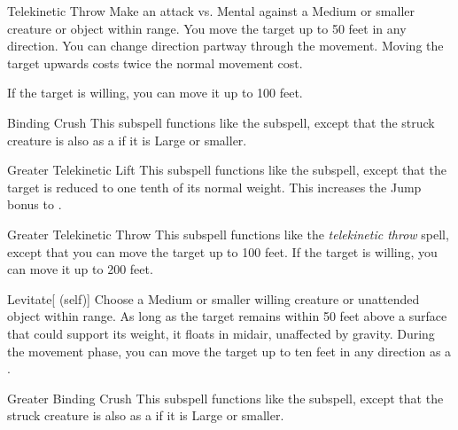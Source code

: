 \begin{ability}[\nth{1}]{Telekinetic Throw}
Make an attack vs. Mental against a Medium or smaller creature or object within \rngmed range.
\hit You move the target up to 50 feet in any direction.
You can change direction partway through the movement.
Moving the target upwards costs twice the normal movement cost.

If the target is willing, you can move it up to 100 feet.
\end{ability}
\vspace{0.25em}


\begin{ability}[\nth{2}]{Binding Crush}
This subspell functions like the  subspell, except that the struck creature is also  as a  if it is Large or smaller.
\end{ability}
\vspace{0.25em}


\begin{ability}[\nth{3}]{Greater Telekinetic Lift}
This subspell functions like the  subspell, except that the target is reduced to one tenth of its normal weight.
This increases the Jump bonus to .
\end{ability}
\vspace{0.25em}


\begin{ability}[\nth{3}]{Greater Telekinetic Throw}
This subspell functions like the \textit{telekinetic throw} spell, except that you can move the target up to 100 feet.
If the target is willing, you can move it up to 200 feet.
\end{ability}
\vspace{0.25em}


\begin{ability}[\nth{4}]{Levitate}[ (self)]
Choose a Medium or smaller willing creature or unattended object within \rngclose range.
As long as the target remains within 50 feet above a surface that could support its weight, it floats in midair, unaffected by gravity.
During the movement phase, you can move the target up to ten feet in any direction as a .
\end{ability}
\vspace{0.25em}


\begin{ability}[\nth{5}]{Greater Binding Crush}
This subspell functions like the  subspell, except that the struck creature is also  as a  if it is Large or smaller.
\end{ability}
\vspace{0.25em}

